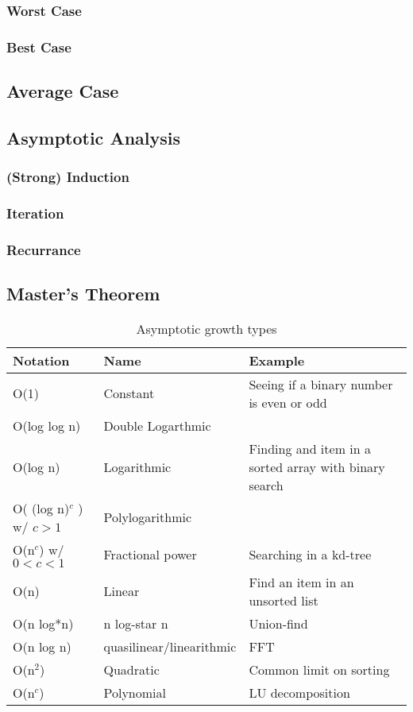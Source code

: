 		\subsubsection{Worst Case}
		\subsubsection{Best Case}
		\subsection{Average Case}

\subsection{Asymptotic Analysis}
\subsubsection{(Strong) Induction}
\subsubsection{Iteration}
\subsubsection{Recurrance}

\subsection{Master's Theorem}


\begin{table}
	\caption{Asymptotic growth types}
	\label{table:asymtoticGrowth}
\begin{tabular}{lll}
\hline\hline
Notation& Name& Example\\\hline
O(1)&Constant&Seeing if a binary number is even or odd\\
O(log log n) &Double Logarthmic& \\
O(log n)& Logarithmic& Finding and item in a sorted array with binary search\\
O( (log n)$^c$ ) w/ $c>1$& Polylogarithmic& \\
O(n$^c$) w/ $0<c<1$&Fractional power &Searching in a kd-tree \\
O(n)& Linear& Find an item in an unsorted list\\
O(n log*n)& n log-star n& Union-find\\
O(n log n)& quasilinear/linearithmic& FFT\\
O(n$^2$)& Quadratic&Common limit on sorting\\
O(n$^c$)& Polynomial& LU decomposition\\
\hline\hline
\end{tabular}
\end{table}

